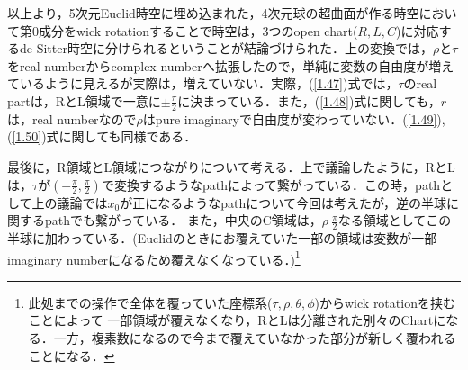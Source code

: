 以上より，5次元Euclid時空に埋め込まれた，4次元球の超曲面が作る時空において第$0$成分をwick rotationすることで時空は，3つのopen chart($R,L,C$)に対応するde Sitter時空に分けられるということが結論づけられた．上の変換では，$\rho$と$\tau$をreal numberからcomplex numberへ拡張したので，単純に変数の自由度が増えているように見えるが実際は，増えていない．実際，(\ref{1.47})式では，$\tau$のreal partは，RとL領域で一意に$\pm\frac{\pi}{2}$に決まっている．また，(\ref{1.48})式に関しても，$r$は，real numberなので$\rho$はpure imaginaryで自由度が変わっていない．(\ref{1.49}),(\ref{1.50})式に関しても同様である．

最後に，R領域とL領域につながりについて考える．上で議論したように，RとLは，$\tau$が$(-\frac{\pi}{2},\frac{\pi}{2})$で変換するようなpathによって繋がっている．この時，pathとして上の議論では$x_0$が正になるようなpathについて今回は考えたが，逆の半球に関するpathでも繋がっている．
また，中央のC領域は，$\rho~\frac{\pi}{2}$なる領域としてこの半球に加わっている．(Euclidのときにお覆えていた一部の領域は変数が一部imaginary numberになるため覆えなくなっている．)\footnote{此処までの操作で全体を覆っていた座標系($\tau,\rho,\theta,\phi$)からwick rotationを挟むことによって
一部領域が覆えなくなり，RとLは分離された別々のChartになる．一方，複素数になるので今まで覆えていなかった部分が新しく覆われることになる．}

